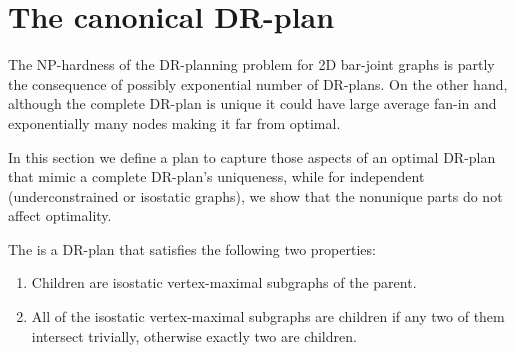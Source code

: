 \section{The canonical DR-plan}
\label{sec:DRP}


The NP-hardness of the DR-planning problem for 2D bar-joint graphs is partly
the consequence of possibly exponential number of DR-plans. On
the other hand, although the complete DR-plan is unique
it could have large average fan-in and exponentially many nodes making it
far from optimal.

In this section we define a  plan to capture those aspects of an optimal
DR-plan that mimic a complete DR-plan's uniqueness, while for independent
(underconstrained or isostatic graphs), we show that the nonunique parts do not affect
optimality.

\begin{definition}
    The  is a DR-plan that satisfies the following two properties:
    \begin{enumerate}
        \item Children are isostatic vertex-maximal subgraphs of the parent.
        \item All of the isostatic vertex-maximal subgraphs are children if any two of them intersect trivially, otherwise exactly two are children.
    \end{enumerate}
\end{definition}


